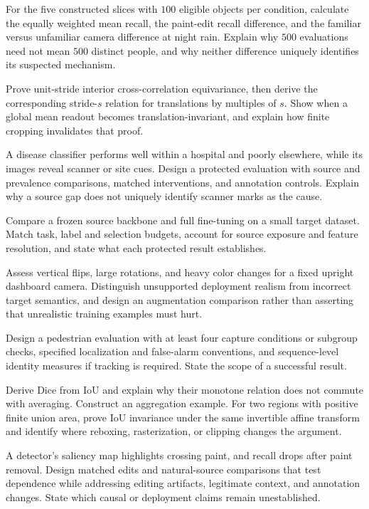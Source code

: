 \begin{exercises}
\item {}For the five constructed slices with $100$ eligible objects per condition, calculate the equally weighted mean recall, the paint-edit recall difference, and the familiar versus unfamiliar camera difference at night rain. Explain why $500$ evaluations need not mean $500$ distinct people, and why neither difference uniquely identifies its suspected mechanism.
\end{exercises}

\begin{challengeexercises}
\item {}Prove unit-stride interior cross-correlation equivariance, then derive the corresponding stride-$s$ relation for translations by multiples of $s$. Show when a global mean readout becomes translation-invariant, and explain how finite cropping invalidates that proof.
\item {}A disease classifier performs well within a hospital and poorly elsewhere, while its images reveal scanner or site cues. Design a protected evaluation with source and prevalence comparisons, matched interventions, and annotation controls. Explain why a source gap does not uniquely identify scanner marks as the cause.
\item {}Compare a frozen source backbone and full fine-tuning on a small target dataset. Match task, label and selection budgets, account for source exposure and feature resolution, and state what each protected result establishes.
\item {}Assess vertical flips, large rotations, and heavy color changes for a fixed upright dashboard camera. Distinguish unsupported deployment realism from incorrect target semantics, and design an augmentation comparison rather than asserting that unrealistic training examples must hurt.
\item {}Design a pedestrian evaluation with at least four capture conditions or subgroup checks, specified localization and false-alarm conventions, and sequence-level identity measures if tracking is required. State the scope of a successful result.
\item {}Derive Dice from IoU and explain why their monotone relation does not commute with averaging. Construct an aggregation example. For two regions with positive finite union area, prove IoU invariance under the same invertible affine transform and identify where reboxing, rasterization, or clipping changes the argument.
\item {}A detector's saliency map highlights crossing paint, and recall drops after paint removal. Design matched edits and natural-source comparisons that test dependence while addressing editing artifacts, legitimate context, and annotation changes. State which causal or deployment claims remain unestablished.
\end{challengeexercises}

\clearpage
\begingroup\pagestyle{empty}\cleardoublepage\endgroup
\endgroup
